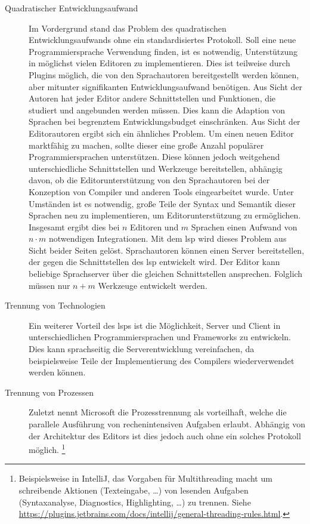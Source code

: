 \begin{description}
    \item[Quadratischer Entwicklungsaufwand]
    Im Vordergrund stand das Problem des quadratischen Entwicklungsaufwands ohne ein standardisiertes Protokoll.
    Soll eine neue Programmiersprache Verwendung finden, ist es notwendig, Unterstützung in möglichst vielen Editoren zu implementieren.
    Dies ist teilweise durch Plugins möglich, die von den Sprachautoren bereitgestellt werden können, aber mitunter signifikanten Entwicklungsaufwand benötigen.
    Aus Sicht der Autoren hat jeder Editor andere Schnittstellen und Funktionen, die studiert und angebunden werden müssen.
    Dies kann die Adaption von Sprachen bei begrenztem Entwicklungsbudget einschränken.
    Aus Sicht der Editorautoren ergibt sich ein ähnliches Problem.
    Um einen neuen Editor marktfähig zu machen, sollte dieser eine große Anzahl populärer Programmiersprachen unterstützen.
    Diese können jedoch weitgehend unterschiedliche Schnittstellen und Werkzeuge bereitstellen, abhängig davon, ob die Editorunterstützung von den Sprachautoren bei der Konzeption von Compiler und anderen Tools eingearbeitet wurde.
    Unter Umständen ist es notwendig, große Teile der Syntax und Semantik dieser Sprachen neu zu implementieren, um Editorunterstützung zu ermöglichen.
    Insgesamt ergibt dies bei $n$ Editoren und $m$ Sprachen einen Aufwand von $n \cdot m$ notwendigen Integrationen.
    Mit dem \ac{lsp} wird dieses Problem aus Sicht beider Seiten gelöst.
    Sprachautoren können einen Server bereitstellen, der gegen die Schnittstellen des \ac{lsp} entwickelt wird.
    Der Editor kann beliebige Sprachserver über die gleichen Schnittstellen ansprechen.
    Folglich müssen nur $n + m$ Werkzeuge entwickelt werden.\cite{why-lsp}
    \item[Trennung von Technologien]
    Ein weiterer Vorteil des \acp{lsp} ist die Möglichkeit, Server und Client in unterschiedlichen Programmiersprachen und Frameworks zu entwickeln.
    Dies kann sprachseitig die Serverentwicklung vereinfachen, da beispielsweise Teile der Implementierung des Compilers wiederverwendet werden können.\cite{why-lsp}
    \item[Trennung von Prozessen]
    Zuletzt nennt Microsoft die Prozesstrennung als vorteilhaft, welche die parallele Ausführung von rechenintensiven Aufgaben erlaubt.\cite{why-lsp}
    Abhängig von der Architektur des Editors ist dies jedoch auch ohne ein solches Protokoll möglich.
    \footnote{Beispielsweise in IntelliJ, das Vorgaben für Multithreading macht um schreibende Aktionen (Texteingabe, \ldots) von lesenden Aufgaben (Syntaxanalyse, Diagnostics, Highlighting, \ldots) zu trennen. Siehe \url{https://plugins.jetbrains.com/docs/intellij/general-threading-rules.html}.}
\end{description}

